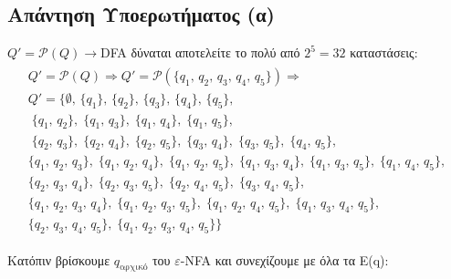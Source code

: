 \subsection{Απάντηση Υποερωτήματος (α)}
\label{ssec:Solution_3.1}
\doublespacing
$Q' = \mathcal{P}(Q)\rightarrow$DFA δύναται αποτελείτε το πολύ από $2^5 = 32$ καταστάσεις:
\reducevspace\reducevspace\reducevspace\reducevspace\reducevspace\reducevspace\reducevspace
\begin{equation*}
	\begin{split}
		\begin{gathered}
			Q' = \mathcal{P}(Q) \Rightarrow Q' = \mathcal{P}(\{q_1,\,q_2,\,q_3,\,q_4,\,q_5\}) \Rightarrow
			\\ Q' = \{\emptyset,\,\{q_1\},\,\{q_2\},\,\{q_3\},\,\{q_4\},\,\{q_5\},
			\\ \;\{q_1,\,q_2\},\;\{q_1,\,q_3\},\;\{q_1,\,q_4\},\;\{q_1,\,q_5\},
			\\ \;\{q_2,\,q_3\},\;\{q_2,\,q_4\},\;\{q_2,\,q_5\},
				\;\{q_3,\,q_4\},\;\{q_3,\,q_5\},\;\{q_4,\,q_5\},
			\\ \{q_1,\,q_2,\,q_3\},\;\{q_1,\,q_2,\,q_4\},\;\{q_1,\,q_2,\,q_5\},
				\;\{q_1,\,q_3,\,q_4\},\;\{q_1,\,q_3,\,q_5\},\;\{q_1,\,q_4,\,q_5\},
			\\ \{q_2,\,q_3,\,q_4\},\;\{q_2,\,q_3,\,q_5\},\;\{q_2,\,q_4,\,q_5\},\;\{q_3,\,q_4,\,q_5\},
			\\ \{q_1,\,q_2,\,q_3,\,q_4\},\;\{q_1,\,q_2,\,q_3,\,q_5\},
				\;\{q_1,\,q_2,\,q_4,\,q_5\},\;\{q_1,\,q_3,\,q_4,\,q_5\},
			\\ \{q_2,\,q_3,\,q_4,\,q_5\},\;\{q_1,\,q_2,\,q_3,\,q_4,\,q_5\}\}
		\end{gathered}
	\end{split}
\end{equation*}

\par
Κατόπιν βρίσκουμε $q_{\text{αρχικό}}$ του $ε$-NFA και συνεχίζουμε με όλα τα E(q):
\hfill \break
\setlength{\arrayrulewidth}{0.5mm}
\setlength{\tabcolsep}{18pt}
\renewcommand{\arraystretch}{1}


